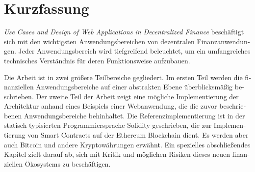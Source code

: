 \chapter{Kurzfassung}

\begin{german}
\textit{Use Cases and Design of Web Applications in Decentralized Finance} beschäftigt sich mit den wichtigsten Anwendungsbereichen von dezentralen
Finanzanwendungen. Jeder Anwendungsbereich wird tiefgreifend beleuchtet, um ein umfangreiches technisches Verständnis für deren Funktionsweise
aufzubauen.

Die Arbeit ist in zwei größere Teilbereiche gegliedert. Im ersten Teil werden die finanziellen Anwendungsbereiche auf einer abstrakten Ebene
überblicksmäßig beschrieben. Der zweite Teil der Arbeit zeigt eine mögliche Implementierung der Architektur anhand eines Beispiels einer Webanwendung,
die die zuvor beschriebenen Anwendungsbereiche behinhaltet. Die Referenzimplementierung ist in der statisch typisierten Programmiersprache Solidity
geschrieben, die zur Implementierung von Smart Contracts auf der Ethereum Blockchain dient. Es werden aber auch Bitcoin und andere
Kryptowährungen erwähnt. Ein spezielles abschließendes Kapitel zielt darauf ab, sich mit Kritik und möglichen Risiken dieses neuen finanziellen
Ökosystems zu beschäftigen.
\end{german}